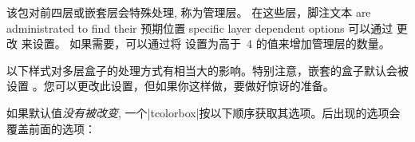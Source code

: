 该包对前四层或嵌套层会特殊处理, 称为管理层。%
在这些层，脚注文本 are administrated to find their 预期位置 specific layer dependent options 可以通过 更改  来设置。
如果需要，可以通过将  设置为高于~4 的值来增加管理层的数量。



以下样式对多层盒子的处理方式有相当大的影响。特别注意，嵌套的盒子默认会被设置  。您可以更改此设置，但如果你这样做，要做好惊讶的准备。


如果默认值\emph{没有被改变}, 一个|tcolorbox|按以下顺序获取其选项。后出现的选项会覆盖前面的选项：


